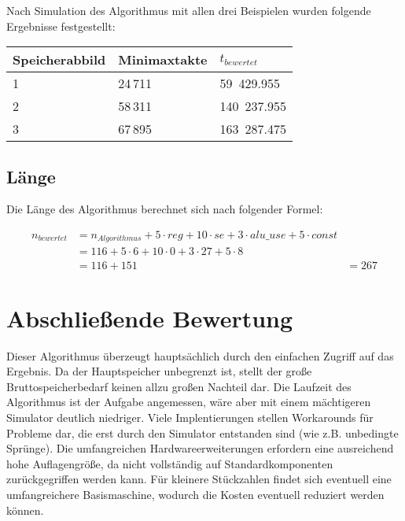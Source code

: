 Nach Simulation des Algorithmus mit allen drei Beispielen wurden folgende Ergebnisse festgestellt: 

\begin{center}
    \begin{tabular}{|l|l|l|}
        \hline
        Speicherabbild & Minimaxtakte & $t_{bewertet}$ \\
        \hline
        \hline
        1 & 24\,711 & 59\ 429.955 \\
        \hline
        2 & 58\,311 & 140\ 237.955 \\
        \hline
        3 & 67\,895 & 163\ 287.475 \\
        \hline
    \end{tabular}
\end{center}

\subsection{Länge}
\label{subsection:Dokumentation-BenchmarkBewertung-Berechnung-Laenge}

Die Länge des Algorithmus berechnet sich nach folgender Formel:

\begin{align*}
    n_{bewertet} &= n_{Algorithmus} + 5 \cdot reg + 10 \cdot se + 3 \cdot alu\_use + 5 \cdot const \\
                 &= 116 + 5 \cdot 6 + 10 \cdot 0 + 3 \cdot 27 + 5 \cdot 8 \\
                 &= 116 + 151
                 &= 267
\end{align*}

\section{Abschließende Bewertung}
\label{section:Dokumentation-BenchmarkBewertung-Bewertung}

Dieser Algorithmus überzeugt hauptsächlich durch den einfachen Zugriff auf das Ergebnis. Da der Hauptspeicher unbegrenzt ist, stellt der große Bruttospeicherbedarf keinen allzu großen Nachteil dar. Die Laufzeit des Algorithmus ist der Aufgabe angemessen, wäre aber mit einem mächtigeren Simulator deutlich niedriger. Viele Implentierungen stellen Workarounds für Probleme dar, die erst durch den Simulator entstanden sind (wie z.B. unbedingte Sprünge). Die umfangreichen Hardwareerweiterungen erfordern eine ausreichend hohe Auflagengröße, da nicht vollständig auf Standardkomponenten zurückgegriffen werden kann. Für kleinere Stückzahlen findet sich eventuell eine umfangreichere Basismaschine, wodurch die Kosten eventuell reduziert werden können.

